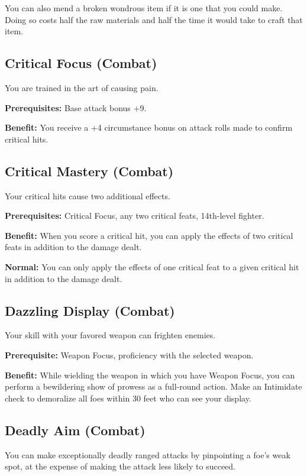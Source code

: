 You can also mend a broken wondrous item if it is one that you could make. Doing so costs half the raw materials and half the time it would take to craft that item.
				
\subsection{Critical Focus (Combat)}

				
You are trained in the art of causing pain.
				
\textbf{Prerequisites:} Base attack bonus +9.
				
\textbf{Benefit:} You receive a +4 circumstance bonus on attack rolls made to confirm critical hits.
				
\subsection{Critical Mastery (Combat)}

				
Your critical hits cause two additional effects.
				
\textbf{Prerequisites:} Critical Focus, any two critical feats, 14th-level fighter.
				
\textbf{Benefit:} When you score a critical hit, you can apply the effects of two critical feats in addition to the damage dealt.
				
\textbf{Normal:} You can only apply the effects of one critical feat to a given critical hit in addition to the damage dealt.
				
\subsection{Dazzling Display (Combat)}

				
Your skill with your favored weapon can frighten enemies.
				
\textbf{Prerequisite:} Weapon Focus, proficiency with the selected weapon.
				
\textbf{Benefit:} While wielding the weapon in which you have Weapon Focus, you can perform a bewildering show of prowess as a full-round action. Make an Intimidate check to demoralize all foes within 30 feet who can see your display. 
				
\subsection{Deadly Aim (Combat)}

				
You can make exceptionally deadly ranged attacks by pinpointing a foe's weak spot, at the expense of making the attack less likely to succeed.
				
